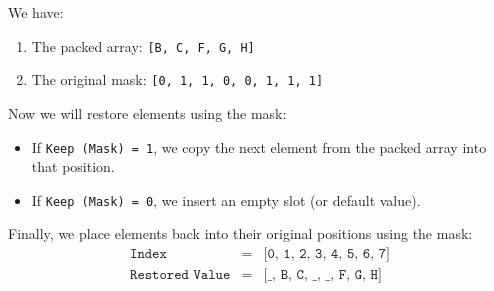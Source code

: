 \begin{examplebox}
    We have:
    \begin{enumerate}
        \item The packed array: \texttt{[B, C, F, G, H]}
        \item The original mask: \texttt{[0, 1, 1, 0, 0, 1, 1, 1]}
    \end{enumerate}
    Now we will restore elements using the mask:
    \begin{itemize}
        \item If \texttt{Keep (Mask) = 1}, we copy the next element from the packed array into that position.
        \item If \texttt{Keep (Mask) = 0}, we insert an empty slot (or default value).
    \end{itemize}
    Finally, we place elements back into their original positions using the mask:
    \begin{equation*}
        \begin{array}{rcl}
            \texttt{Index}          & = & \texttt{[0, 1, 2, 3, 4, 5, 6, 7]} \\ [.5em]
            \texttt{Restored Value} & = & \texttt{[\_, B, C, \_, \_, F, G, H]}
        \end{array}
    \end{equation*}
\end{examplebox}